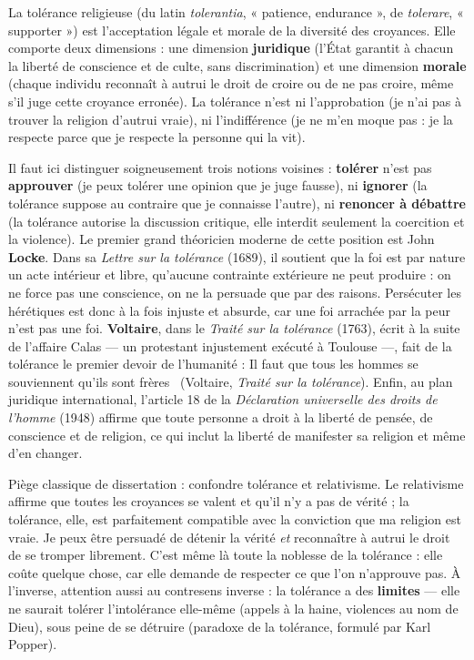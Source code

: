\documentclass[11pt]{article}
\newcommand{\cle}[1]{{\popxbold\color{popdark}#1}}
\begin{document}
\begin{definition}
La \cle{tolérance religieuse} (du latin \emph{tolerantia}, « patience, endurance », de \emph{tolerare}, « supporter ») est l'\cle{acceptation légale et morale de la diversité des croyances}. Elle comporte deux dimensions : une dimension \textbf{juridique} (l'État garantit à chacun la liberté de conscience et de culte, sans discrimination) et une dimension \textbf{morale} (chaque individu reconnaît à autrui le droit de croire ou de ne pas croire, même s'il juge cette croyance erronée). La tolérance n'est ni l'approbation (je n'ai pas à trouver la religion d'autrui vraie), ni l'indifférence (je ne m'en moque pas : je la respecte parce que je respecte la personne qui la vit).
\end{definition}

Il faut ici distinguer soigneusement trois notions voisines : \textbf{tolérer} n'est pas \textbf{approuver} (je peux tolérer une opinion que je juge fausse), ni \textbf{ignorer} (la tolérance suppose au contraire que je connaisse l'autre), ni \textbf{renoncer à débattre} (la tolérance autorise la discussion critique, elle interdit seulement la coercition et la violence). Le premier grand théoricien moderne de cette position est John \textbf{Locke}. Dans sa \emph{Lettre sur la tolérance} (1689), il soutient que la foi est par nature un acte intérieur et libre, qu'aucune contrainte extérieure ne peut produire : on ne force pas une conscience, on ne la persuade que par des raisons. Persécuter les hérétiques est donc à la fois injuste et absurde, car une foi arrachée par la peur n'est pas une foi. \textbf{Voltaire}, dans le \emph{Traité sur la tolérance} (1763), écrit à la suite de l'affaire Calas — un protestant injustement exécuté à Toulouse —, fait de la tolérance le premier devoir de l'humanité : \guillemotleft Il faut que tous les hommes se souviennent qu'ils sont frères \guillemotright\ (Voltaire, \emph{Traité sur la tolérance}). Enfin, au plan juridique international, l'article 18 de la \emph{Déclaration universelle des droits de l'homme} (1948) affirme que toute personne a droit à la liberté de pensée, de conscience et de religion, ce qui inclut la liberté de manifester sa religion et même d'en changer.

\begin{attention}
Piège classique de dissertation : confondre tolérance et \cle{relativisme}. Le relativisme affirme que toutes les croyances se valent et qu'il n'y a pas de vérité ; la tolérance, elle, est parfaitement compatible avec la conviction que ma religion est vraie. Je peux être persuadé de détenir la vérité \emph{et} reconnaître à autrui le droit de se tromper librement. C'est même là toute la noblesse de la tolérance : elle coûte quelque chose, car elle demande de respecter ce que l'on n'approuve pas. À l'inverse, attention aussi au contresens inverse : la tolérance a des \textbf{limites} — elle ne saurait tolérer l'intolérance elle-même (appels à la haine, violences au nom de Dieu), sous peine de se détruire (paradoxe de la tolérance, formulé par Karl Popper).
\end{attention}
\end{document}
